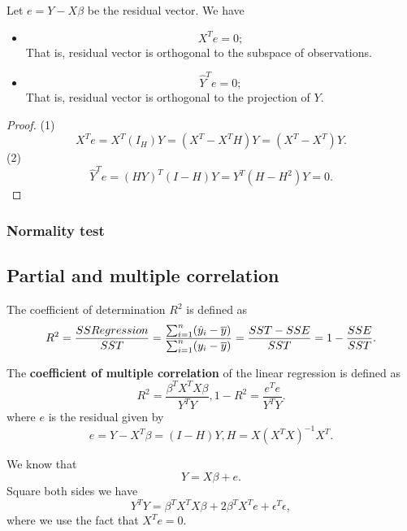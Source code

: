 \begin{refsection}
\begin{lemma}
Let $e = Y-X\beta$ be the residual vector. 
We have
\begin{itemize}
	\item $$X^Te = 0;$$
	That is, residual vector is orthogonal to the subspace of observations.
	\item $$\hat{Y}^Te = 0;$$
	That is, residual vector is orthogonal to the projection of $Y$.
\end{itemize}	
\end{lemma}
\begin{proof}
(1)	
$$X^Te = X^T(I_H)Y = (X^T - X^TH)Y = (X^T - X^T)Y.$$
(2)
$$\hat{Y}^Te  = (HY)^T(I-H)Y = Y^T(H-H^2)Y = 0.$$
\end{proof}




\subsubsection{Normality test}



\subsection{Partial and multiple correlation}



\begin{definition}
	The coefficient of determination $R^2$ is defined as 
	$$R^2 = \frac{SSRegression}{SST} = \frac{\sum_{i=1}^n (\hat{y}_i - \overline{y})}{\sum_{i=1}^n (y_i - \overline{y})} = \frac{SST - SSE}{SST} = 1 -\frac{SSE}{SST}.$$
\end{definition}


\begin{definition}\cite[164]{theil1971principles}
The \textbf{coefficient of multiple correlation} of the linear regression is defined as
$$R^2 = \frac{\beta^T X^TX \beta}{Y^TY}, 1-R^2 = \frac{e^Te}{Y^TY}.$$
where $e$ is the residual given by
$$e = Y - X^T\beta = (I - H)Y,H = X(X^TX)^{-1}X^T.$$	
\end{definition}


\begin{remark}
We know that
$$Y = X\beta + e.$$
Square both sides we have
$$Y^TY = \beta^TX^TX\beta + 2\beta^TX^Te + \epsilon^T\epsilon,$$
where we use the fact that $X^Te = 0.$	
\end{remark}


\end{refsection}
